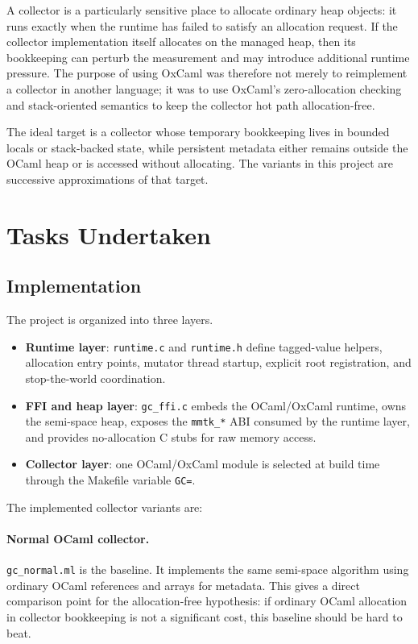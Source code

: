 \documentclass[11pt,a4paper]{article}
\begin{document}
A collector is a particularly sensitive place to allocate ordinary heap objects:
it runs exactly when the runtime has failed to satisfy an allocation request.
If the collector implementation itself allocates on the managed heap, then its
bookkeeping can perturb the measurement and may introduce additional runtime
pressure. The purpose of using OxCaml was therefore not merely to reimplement a
collector in another language; it was to use OxCaml's zero-allocation checking
and stack-oriented semantics to keep the collector hot path allocation-free.

The ideal target is a collector whose temporary bookkeeping lives in bounded
locals or stack-backed state, while persistent metadata either remains outside
the OCaml heap or is accessed without allocating. The variants in this project
are successive approximations of that target.

\section{Tasks Undertaken}
\label{sec:tasks}

\subsection{Implementation}

The project is organized into three layers.

\begin{itemize}[leftmargin=*]
  \item \textbf{Runtime layer}: \texttt{runtime.c} and \texttt{runtime.h}
  define tagged-value helpers, allocation entry points, mutator thread startup,
  explicit root registration, and stop-the-world coordination.
  \item \textbf{FFI and heap layer}: \texttt{gc\_ffi.c} embeds the OCaml/OxCaml
  runtime, owns the semi-space heap, exposes the \texttt{mmtk\_*} ABI consumed
  by the runtime layer, and provides no-allocation C stubs for raw memory
  access.
  \item \textbf{Collector layer}: one OCaml/OxCaml module is selected at build
  time through the Makefile variable \texttt{GC=}.
\end{itemize}

The implemented collector variants are:

\paragraph{Normal OCaml collector.}
\texttt{gc\_normal.ml} is the baseline. It implements the same semi-space
algorithm using ordinary OCaml references and arrays for metadata. This gives a
direct comparison point for the allocation-free hypothesis: if ordinary OCaml
allocation in collector bookkeeping is not a significant cost, this baseline
should be hard to beat.
\end{document}
